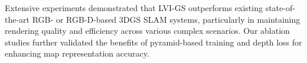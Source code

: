 \documentclass[lettersize,journal]{IEEEtran}
\begin{document}
Extensive experiments demonstrated that LVI-GS outperforms existing state-of-the-art RGB- or RGB-D-based 3DGS SLAM systems, particularly in maintaining rendering quality and efficiency across various complex scenarios. Our ablation studies further validated the benefits of pyramid-based training and depth loss for enhancing map representation accuracy.

\textcolor{red}{}





\end{document}
